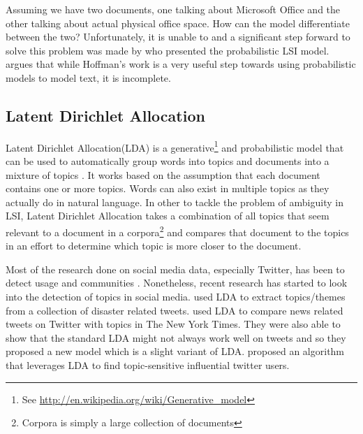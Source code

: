 Assuming we have two documents, one talking about Microsoft Office and the other talking about
actual physical office space. How can the model differentiate between the two? Unfortunately, it is
unable to and a significant step forward to solve this problem was made by
\citet{hofmann1999probabilistic} who presented the probabilistic LSI model. \citet{blei2003latent}
argues that while Hoffman's work is a very useful step towards using probabilistic models to model
text, it is incomplete.

\subsection{Latent Dirichlet Allocation}
\label{sub:bg_lda}
Latent Dirichlet Allocation(LDA) is a generative\footnote{See
\url{http://en.wikipedia.org/wiki/Generative_model}} and probabilistic model that can be used to
automatically group words into topics and documents into a mixture of topics \citep{blei2003latent}.
It works based on the assumption that each document contains one or more topics. Words can also
exist in multiple topics as they actually do in natural language. In other to tackle the problem of
ambiguity in LSI, Latent Dirichlet Allocation takes a combination of all topics that seem relevant
to a document in a corpora\footnote{Corpora is simply a large collection of documents} and compares
that document to the topics in an effort to determine which topic is more closer to the document.

Most of the research done on social media data, especially Twitter, has been to detect usage and
communities \citep{java2007we}. Nonetheless, recent research has started to look into the detection
of topics in social media. \citet{kireyev2009applications} used LDA to extract topics/themes from a
collection of disaster related tweets. \citet{zhao2011comparing} used LDA to compare news related
tweets on Twitter with topics in The New York Times. They were also able to show that the standard
LDA might not always work well on tweets and so they proposed a new model which is a slight variant
of LDA. \citet{weng2010twitterrank} proposed an algorithm that leverages LDA to find topic-sensitive
influential twitter users.

